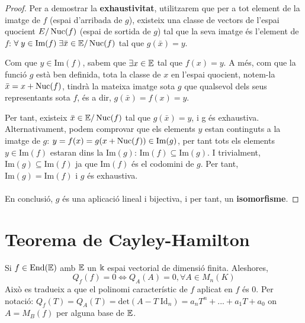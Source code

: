\begin{proof}
Per a demostrar la \textbf{exhaustivitat}, utilitzarem que per a tot element de la imatge de $f$ (espai d'arribada de $g$), existeix una classe de vectors de l'espai quocient $E/\operatorname{Nuc}(f)$ (espai de sortida de $g$) tal que la seva imatge és l'element de $f$: $\forall \; y \in \text{Im}(f) \; \exists \bar{x} \in \mathbb{E}/\operatorname{Nuc}(f)$ tal que $g(\bar{x}) = y$.


Com que $y \in \text{Im}(f)$, sabem que $\exists x \in \mathbb{E}$ tal que $f(x) = y$. A més, com que la funció $g$ està ben definida, tota la classe de $x$ en l'espai quocient, notem-la $\bar{x} = x + \operatorname{Nuc}(f)$, tindrà la mateixa imatge sota $g$ que qualsevol dels seus representants sota $f$, és a dir, $g(\bar{x}) = f(x) = y$.

Per tant, existeix $\bar{x} \in \mathbb{E}/\operatorname{Nuc}(f)$ tal que $g(\bar{x}) = y$, i g és exhaustiva. 
\\

Alternativament, podem comprovar que els elements $y$ estan continguts a la imatge de $g$: $y = f(x) = g(x + \operatorname{Nuc}(f)) \in \text{Im}(g)$, per tant tots els elements $y \in \text{Im}(f)$ estaran dins la $\text{Im}(g)$: $\text{Im}(f) \subseteq \text{Im}(g)$. I trivialment, $\text{Im}(g) \subseteq \text{Im}(f)$ ja que $\text{Im}(f)$ és el codomini de $g$. Per tant, $\text{Im}(g) = \text{Im}(f)$ i $g$ és exhaustiva.
\\\\
En conclusió, $g$ és una aplicació lineal i bijectiva, i per tant, un \textbf{isomorfisme}.
\end{proof}

\section{Teorema de Cayley-Hamilton}
Si $f \in \text{End}(\mathbb{E})$ amb $\mathbb{E}$ un $\Bbbk$ espai vectorial de dimensió finita. Aleshores, 
$$ Q_f(f) = 0 \Leftrightarrow Q_A(A) = 0, \forall A \in M_n(K)$$
Això es tradueix a que el polinomi característic de $f$ aplicat en $f$ és 0. Per notació: $Q_f(T) = Q_A(T) = \text{det}(A - T\;\text{Id}_n) = a_nT^n +...+a_1T + a_0$ on $A = M_B(f)$ per alguna base de $\mathbb{E}$.
\\

